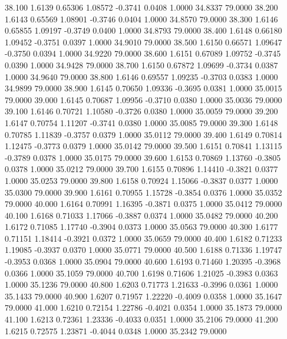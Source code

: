  38.100   1.6139   0.65306   1.08572  -0.3741   0.0408   1.0000  34.8337  79.0000
  38.200   1.6143   0.65569   1.08901  -0.3746   0.0404   1.0000  34.8570  79.0000
  38.300   1.6146   0.65855   1.09197  -0.3749   0.0400   1.0000  34.8793  79.0000
  38.400   1.6148   0.66180   1.09452  -0.3751   0.0397   1.0000  34.9010  79.0000
  38.500   1.6150   0.66571   1.09647  -0.3750   0.0394   1.0000  34.9220  79.0000
  38.600   1.6151   0.67089   1.09752  -0.3745   0.0390   1.0000  34.9428  79.0000
  38.700   1.6150   0.67872   1.09699  -0.3734   0.0387   1.0000  34.9640  79.0000
  38.800   1.6146   0.69557   1.09235  -0.3703   0.0383   1.0000  34.9899  79.0000
  38.900   1.6145   0.70650   1.09336  -0.3695   0.0381   1.0000  35.0015  79.0000
  39.000   1.6145   0.70687   1.09956  -0.3710   0.0380   1.0000  35.0036  79.0000
  39.100   1.6146   0.70721   1.10580  -0.3726   0.0380   1.0000  35.0059  79.0000
  39.200   1.6147   0.70754   1.11207  -0.3741   0.0380   1.0000  35.0085  79.0000
  39.300   1.6148   0.70785   1.11839  -0.3757   0.0379   1.0000  35.0112  79.0000
  39.400   1.6149   0.70814   1.12475  -0.3773   0.0379   1.0000  35.0142  79.0000
  39.500   1.6151   0.70841   1.13115  -0.3789   0.0378   1.0000  35.0175  79.0000
  39.600   1.6153   0.70869   1.13760  -0.3805   0.0378   1.0000  35.0212  79.0000
  39.700   1.6155   0.70896   1.14410  -0.3821   0.0377   1.0000  35.0253  79.0000
  39.800   1.6158   0.70924   1.15066  -0.3837   0.0377   1.0000  35.0300  79.0000
  39.900   1.6161   0.70955   1.15728  -0.3854   0.0376   1.0000  35.0352  79.0000
  40.000   1.6164   0.70991   1.16395  -0.3871   0.0375   1.0000  35.0412  79.0000
  40.100   1.6168   0.71033   1.17066  -0.3887   0.0374   1.0000  35.0482  79.0000
  40.200   1.6172   0.71085   1.17740  -0.3904   0.0373   1.0000  35.0563  79.0000
  40.300   1.6177   0.71151   1.18414  -0.3921   0.0372   1.0000  35.0659  79.0000
  40.400   1.6182   0.71233   1.19085  -0.3937   0.0370   1.0000  35.0771  79.0000
  40.500   1.6188   0.71336   1.19747  -0.3953   0.0368   1.0000  35.0904  79.0000
  40.600   1.6193   0.71460   1.20395  -0.3968   0.0366   1.0000  35.1059  79.0000
  40.700   1.6198   0.71606   1.21025  -0.3983   0.0363   1.0000  35.1236  79.0000
  40.800   1.6203   0.71773   1.21633  -0.3996   0.0361   1.0000  35.1433  79.0000
  40.900   1.6207   0.71957   1.22220  -0.4009   0.0358   1.0000  35.1647  79.0000
  41.000   1.6210   0.72154   1.22786  -0.4021   0.0354   1.0000  35.1873  79.0000
  41.100   1.6213   0.72361   1.23336  -0.4033   0.0351   1.0000  35.2106  79.0000
  41.200   1.6215   0.72575   1.23871  -0.4044   0.0348   1.0000  35.2342  79.0000
